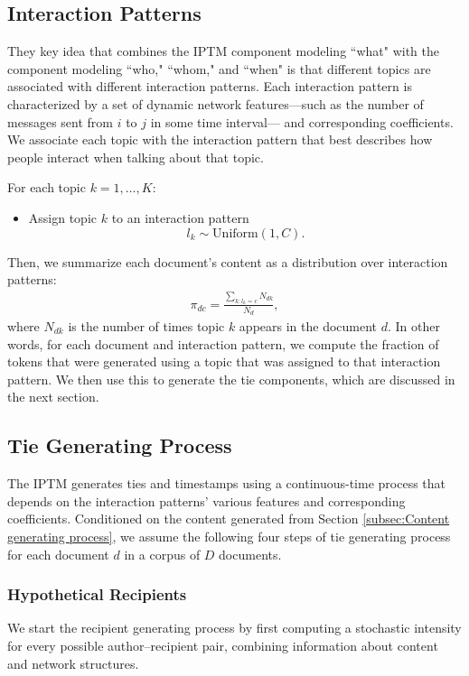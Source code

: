 \documentclass{article}
\begin{document}
\subsection{Interaction Patterns}\label{subsec:Interaction patterns}
They key idea that combines the IPTM component modeling ``what" with
the component modeling ``who," ``whom," and ``when" is that different
topics are associated with different interaction patterns.  Each interaction pattern is characterized by a set of dynamic network features---such as the number of messages sent from $i$ to $j$ in some time interval--- and corresponding coefficients. We associate each topic with the interaction pattern that best describes how people interact when talking about that topic. 

For each topic $k = 1,\ldots,K$:
\begin{itemize} 
	\item Assign topic $k$ to an interaction pattern
	$$l_k\sim \mbox{Uniform}(1, C).$$
\end{itemize}
Then, we summarize each document's content as a distribution
over interaction patterns:
\begin{align*}
\pi_{dc} = \frac{\sum_{k:l_k=c}N_{dk}}{N_d},
\end{align*}
where $N_{dk}$ is the number of times topic $k$ appears in the document $d$. In other words, for each document and interaction pattern, we compute the fraction of tokens that were generated using a topic that was assigned to that interaction
pattern.  We then use this to generate the tie components, which are discussed in the next section.

\subsection{Tie Generating Process}\label{subsec:Tie generating process}
The IPTM generates ties and timestamps using a continuous-time process
that depends on the interaction patterns' various features and
corresponding coefficients. Conditioned on the content generated from Section \ref{subsec:Content generating process}, we assume the following four steps of tie generating process for each document $d$ in a corpus of $D$ documents.

\subsubsection{Hypothetical Recipients}\label{subsubsec:Hypothetical Recipients}
We start the recipient generating process by first computing a stochastic intensity for every possible author--recipient
pair, combining information about content and network structures. 
\end{document}
